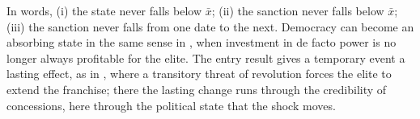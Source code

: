  In words, (i) the state never falls below $\bar x$; (ii) the sanction never falls
below $\bar x$; (iii) the sanction never falls from one date to the next. Democracy can become an absorbing state in the same sense in
\citet[Corollary~2, p.~279]{AcemogluRobinson2008}, when investment in de facto power is
no longer always profitable for the elite. The entry result gives a temporary event a
lasting effect, as in \citet[p.~939]{AcemogluRobinson2001}, where a transitory threat
of revolution forces the elite to extend the franchise; there the lasting change runs
through the credibility of concessions, here through the political state that the
shock moves.

